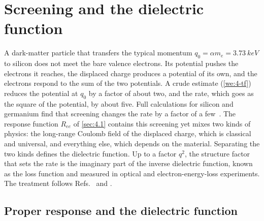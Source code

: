 \section{Screening and the dielectric function}\label{sec:4.4}

A dark-matter particle that transfers the typical momentum $q_0 = \alpha m_e = \SI{3.73}{keV}$ to silicon does not meet the bare valence electrons. Its potential pushes the electrons it reaches, the displaced charge produces a potential of its own, and the electrons respond to the sum of the two potentials. A crude estimate (\cref{we:4-tf}) reduces the potential at $q_0$ by a factor of about two, and the rate, which goes as the square of the potential, by about five. Full calculations for silicon and germanium find that screening changes the rate by a factor of a few~\cite{knapen2021dark}. The response function $R_{ee}$ of \cref{sec:4.1} contains this screening yet mixes two kinds of physics: the long-range Coulomb field of the displaced charge, which is classical and universal, and everything else, which depends on the material. Separating the two kinds defines the dielectric function. Up to a factor $q^2$, the structure factor that sets the rate is the imaginary part of the inverse dielectric function, known as the loss function and measured in optical and electron-energy-loss experiments. The treatment follows Refs.~\cite[Chaps.~3 and 5]{giuliani2005quantum} and \cite{onida2002electronic}.

\subsection{Proper response and the dielectric function}

